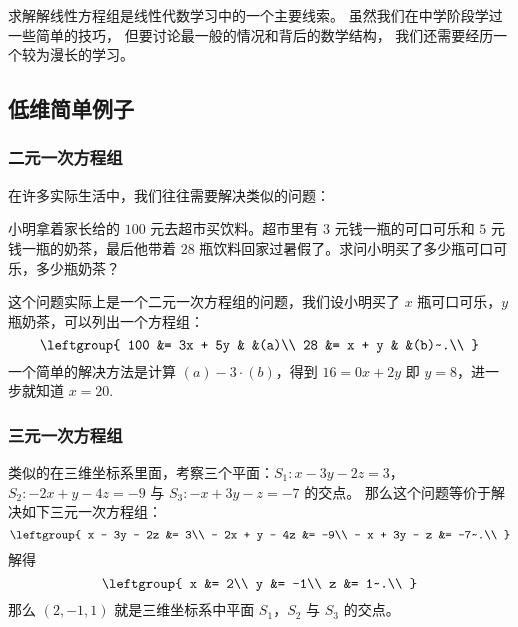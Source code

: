 

求解解线性方程组是线性代数学习中的一个主要线索。 虽然我们在中学阶段学过一些简单的技巧， 但要讨论最一般的情况和背后的数学结构， 我们还需要经历一个较为漫长的学习。

\subsection{低维简单例子}
\subsubsection{二元一次方程组}
在许多实际生活中，我们往往需要解决类似的问题：

小明拿着家长给的 $100$ 元去超市买饮料。超市里有 $3$ 元钱一瓶的可口可乐和 $5$ 元钱一瓶的奶茶，最后他带着 $28$ 瓶饮料回家过暑假了。求问小明买了多少瓶可口可乐，多少瓶奶茶？

这个问题实际上是一个二元一次方程组的问题，我们设小明买了 $x$ 瓶可口可乐，$y$ 瓶奶茶，可以列出一个方程组：\begin{equation}
\leftgroup{
100 &= 3x + 5y & &(a)\\
28 &= x + y & &(b)~.\\
}\end{equation}
一个简单的解决方法是计算 $(a)-3 \cdot (b)$，得到 $16 = 0x + 2y$ 即 $y = 8$，进一步就知道 $x = 20$.

\subsubsection{三元一次方程组}
类似的在三维坐标系里面，考察三个平面：$S_1:x - 3y-2z=3$，$S_2:-2x+y-4z=-9$ 与 $S_3:-x+3y-z=-7$ 的交点。
那么这个问题等价于解决如下三元一次方程组：\begin{equation}
\leftgroup{
x - 3y - 2z &= 3\\
- 2x + y - 4z &= -9\\
- x + 3y - z &= -7~.\\
}\end{equation}
解得\begin{equation}
\leftgroup{
x &= 2\\
y &= -1\\
z &= 1~.\\
}\end{equation}
那么 $(2,-1,1)$ 就是三维坐标系中平面 $S_1$，$S_2$ 与 $S_3$ 的交点。
